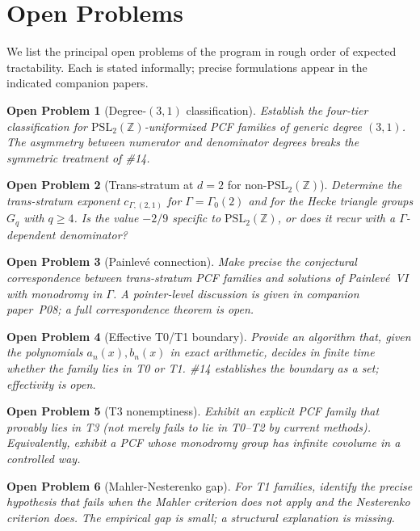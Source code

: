 \documentclass[11pt,a4paper]{article}
\newtheorem{problem}{Open Problem}
\theoremstyle{definition}
\theoremstyle{remark}
\newcommand{\PSLZ}{\mathrm{PSL}_2(\mathbb{Z})}
\begin{document}
\section{Open Problems}
\label{sec:open}

We list the principal open problems of the program in rough order of
expected tractability. Each is stated informally; precise formulations
appear in the indicated companion papers.

\begin{problem}[Degree-$(3,1)$ classification]
\label{prob:31}
Establish the four-tier classification for $\PSLZ$-uniformized PCF
families of generic degree $(3,1)$. The asymmetry between numerator and
denominator degrees breaks the symmetric treatment of \#14.
\end{problem}

\begin{problem}[Trans-stratum at $d=2$ for non-$\PSLZ$]
\label{prob:t2-d2-nonpsl}
Determine the trans-stratum exponent $c_{\Gamma,(2,1)}$ for
$\Gamma = \Gamma_0(2)$ and for the Hecke triangle groups $G_q$ with
$q \geq 4$. Is the value $-2/9$ specific to $\PSLZ$, or does it
recur with a $\Gamma$-dependent denominator?
\end{problem}

\begin{problem}[Painlevé connection]
\label{prob:painleve}
Make precise the conjectural correspondence between trans-stratum PCF
families and solutions of Painlevé~VI with monodromy in $\Gamma$.
A pointer-level discussion is given in companion paper~P08; a full
correspondence theorem is open.
\end{problem}

\begin{problem}[Effective T0/T1 boundary]
\label{prob:effective}
Provide an algorithm that, given the polynomials $a_n(x), b_n(x)$ in
exact arithmetic, decides in finite time whether the family lies in
T0 or T1. \#14 establishes the boundary as a set; effectivity is open.
\end{problem}

\begin{problem}[T3 nonemptiness]
\label{prob:t3}
Exhibit an explicit PCF family that provably lies in T3 (not merely
fails to lie in T0--T2 by current methods). Equivalently, exhibit a
PCF whose monodromy group has infinite covolume in a controlled way.
\end{problem}

\begin{problem}[Mahler-Nesterenko gap]
\label{prob:mahler}
For T1 families, identify the precise hypothesis that fails when the
Mahler criterion does not apply and the Nesterenko criterion does.
The empirical gap is small; a structural explanation is missing.
\end{problem}
\end{document}

